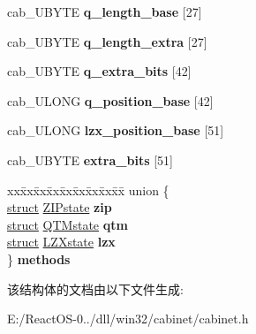 \begin{DoxyCompactItemize}
\item 
\mbox{\label{structcds__forward_a6d2572515bfca056b8f49b9e3721c9f0}} 
cab\+\_\+\+U\+B\+Y\+TE {\bfseries q\+\_\+length\+\_\+base} \mbox{[}27\mbox{]}
\item 
\mbox{\label{structcds__forward_ab177a41a78200d2574c36b76290650e3}} 
cab\+\_\+\+U\+B\+Y\+TE {\bfseries q\+\_\+length\+\_\+extra} \mbox{[}27\mbox{]}
\item 
\mbox{\label{structcds__forward_a4b6e980e96e90fbb93f5019347419850}} 
cab\+\_\+\+U\+B\+Y\+TE {\bfseries q\+\_\+extra\+\_\+bits} \mbox{[}42\mbox{]}
\item 
\mbox{\label{structcds__forward_a6f48ac486a3075ca05f88ff5f27ac1cd}} 
cab\+\_\+\+U\+L\+O\+NG {\bfseries q\+\_\+position\+\_\+base} \mbox{[}42\mbox{]}
\item 
\mbox{\label{structcds__forward_af4a2dafe1f634b2cfed2b9bf1c5642c8}} 
cab\+\_\+\+U\+L\+O\+NG {\bfseries lzx\+\_\+position\+\_\+base} \mbox{[}51\mbox{]}
\item 
\mbox{\label{structcds__forward_a00998926acb33109143eac2126132763}} 
cab\+\_\+\+U\+B\+Y\+TE {\bfseries extra\+\_\+bits} \mbox{[}51\mbox{]}
\item 
\mbox{\label{structcds__forward_a70cceed4460c74ce959504615d0a101f}} 
\begin{tabbing}
xx\=xx\=xx\=xx\=xx\=xx\=xx\=xx\=xx\=\kill
union \{\\
\>\hyperlink{interfacestruct}{struct} \hyperlink{struct_z_i_pstate}{ZIPstate} {\bfseries zip}\\
\>\hyperlink{interfacestruct}{struct} \hyperlink{struct_q_t_mstate}{QTMstate} {\bfseries qtm}\\
\>\hyperlink{interfacestruct}{struct} \hyperlink{struct_l_z_xstate}{LZXstate} {\bfseries lzx}\\
\} {\bfseries methods}\\

\end{tabbing}\end{DoxyCompactItemize}


该结构体的文档由以下文件生成\+:\begin{DoxyCompactItemize}
\item 
E\+:/\+React\+O\+S-\/0../dll/win32/cabinet/cabinet.\+h\end{DoxyCompactItemize}
